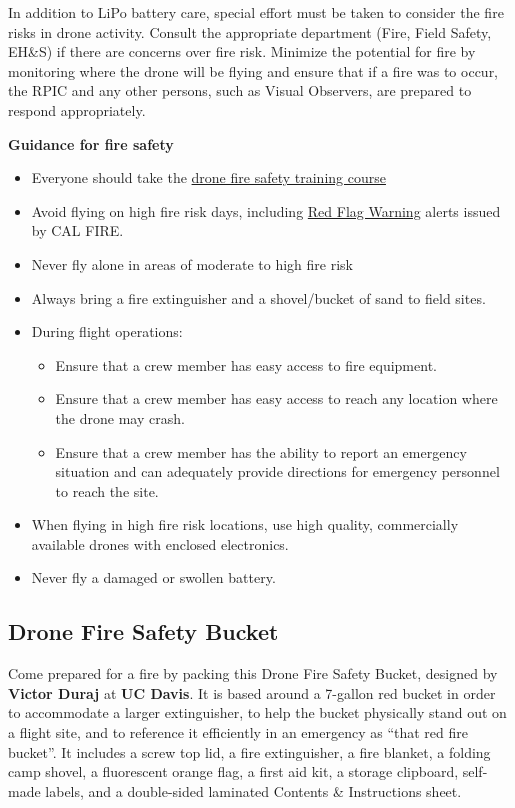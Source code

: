 \documentclass[
  12pt,
]{book}
\providecommand{\tightlist}{%
  \setlength{\itemsep}{0pt}\setlength{\parskip}{0pt}}
\begin{document}
In addition to LiPo battery care, special effort must be taken to consider the fire risks in drone activity. Consult the appropriate department (Fire, Field Safety, EH\&S) if there are concerns over fire risk. Minimize the potential for fire by monitoring where the drone will be flying and ensure that if a fire was to occur, the RPIC and any other persons, such as Visual Observers, are prepared to respond appropriately.

\textbf{Guidance for fire safety}

\begin{itemize}
\item
  Everyone should take the \href{https://ucdrones.github.io/library/trainings/FireSafety/index.html}{drone fire safety training course}
\item
  Avoid flying on high fire risk days, including \href{https://www.fire.ca.gov/programs/communications/red-flag-warnings-fire-weather-watches/}{Red Flag Warning} alerts issued by CAL FIRE.
\item
  Never fly alone in areas of moderate to high fire risk
\item
  Always bring a fire extinguisher and a shovel/bucket of sand to field sites.
\item
  During flight operations:

  \begin{itemize}
  \tightlist
  \item
    Ensure that a crew member has easy access to fire equipment.
  \item
    Ensure that a crew member has easy access to reach any location where the drone may crash.
  \item
    Ensure that a crew member has the ability to report an emergency situation and can adequately provide directions for emergency personnel to reach the site.
  \end{itemize}
\item
  When flying in high fire risk locations, use high quality, commercially available drones with enclosed electronics.
\item
  Never fly a damaged or swollen battery.
\end{itemize}

\subsection{Drone Fire Safety Bucket}\label{drone-fire-safety-bucket}

Come prepared for a fire by packing this Drone Fire Safety Bucket, designed by \textbf{Victor Duraj} at \textbf{UC Davis}. It is based around a 7-gallon red bucket in order to accommodate a larger extinguisher, to help the bucket physically stand out on a flight site, and to reference it efficiently in an emergency as ``that red fire bucket''. It includes a screw top lid, a fire extinguisher, a fire blanket, a folding camp shovel, a fluorescent orange flag, a first aid kit, a storage clipboard, self-made labels, and a double-sided laminated Contents \& Instructions sheet.
\end{document}
